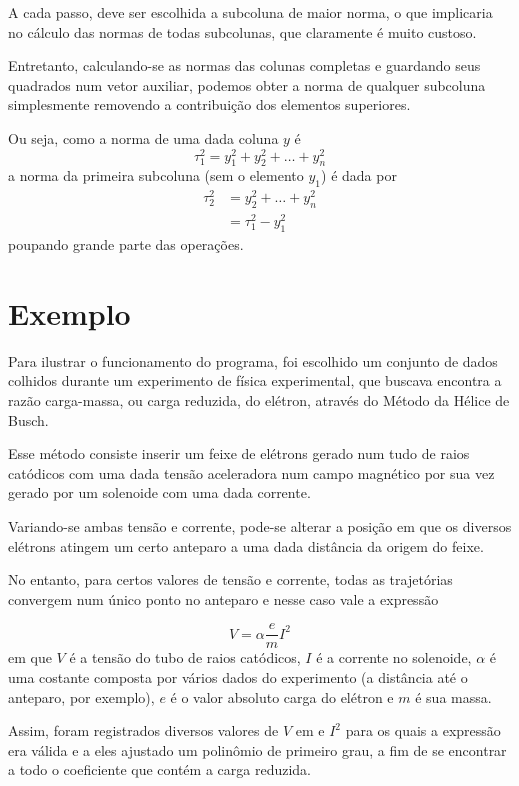 \documentclass[a4paper,11pt]{article}
\begin{document}
            A cada passo, deve ser escolhida a subcoluna de maior norma, o que implicaria no cálculo das normas de todas subcolunas, que claramente é muito custoso.

            Entretanto, calculando-se as normas das colunas completas e guardando seus quadrados num vetor auxiliar, podemos obter a norma de qualquer subcoluna simplesmente removendo a contribuição dos elementos superiores.

            Ou seja, como a norma de uma dada coluna $y$ é
            $$ \tau_1^2 = y_1^2 + y_2^2 + \dots + y_n^2 $$
            a norma da primeira subcoluna (sem o elemento $y_1$) é dada por
            \begin{align*}
                \tau_2^2 &= y_2^2 + \dots + y_n^2 \\
                         &= \tau_1^2 - y_1^2
            \end{align*}
            poupando grande parte das operações.

    \section*{Exemplo}
        Para ilustrar o funcionamento do programa, foi escolhido um conjunto de dados colhidos durante um experimento de física experimental, que buscava encontra a razão carga-massa, ou carga reduzida, do elétron, através do Método da Hélice de Busch.\cite{busch}

        Esse método consiste inserir um feixe de elétrons gerado num tudo de raios catódicos com uma dada tensão aceleradora num campo magnético por sua vez gerado por um solenoide com uma dada corrente.

        Variando-se ambas tensão e corrente, pode-se alterar a posição em que os diversos elétrons atingem um certo anteparo a uma dada distância da origem do feixe.

        No entanto, para certos valores de tensão e corrente, todas as trajetórias convergem num único ponto no anteparo e nesse caso vale a expressão

        $$ V = \alpha \frac{e}{m}I^2 $$
        em que $V$ é a tensão do tubo de raios catódicos, $I$ é a corrente no solenoide, $\alpha$ é uma costante composta por vários dados do experimento (a distância até o anteparo, por exemplo), $e$ é o valor absoluto carga do elétron e $m$ é sua massa.

        Assim, foram registrados diversos valores de $V$ em e $I^2$ para os quais a expressão era válida e a eles ajustado um polinômio de primeiro grau, a fim de se encontrar a todo o coeficiente que contém a carga reduzida.
\end{document}
